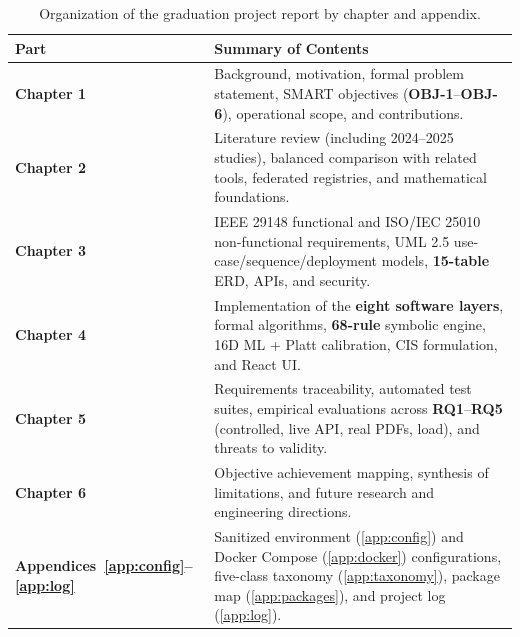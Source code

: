 \begin{table}[!htbp]
\centering
\caption[Organization of the graduation project report]{Organization of the graduation project report by chapter and appendix.}\label{tab:outline}
\begin{tabular}{|L{0.24}|L{0.76}|}
\hline
\textbf{Part} & \textbf{Summary of Contents} \\
\hline
\textbf{Chapter 1} & Background, motivation, formal problem statement, SMART objectives (\textbf{OBJ-1}--\textbf{OBJ-6}), operational scope, and contributions. \\
\hline
\textbf{Chapter 2} & Literature review (including 2024--2025 studies), balanced comparison with related tools, federated registries, and mathematical foundations. \\
\hline
\textbf{Chapter 3} & IEEE 29148 functional and ISO/IEC 25010 non-functional requirements, UML 2.5 use-case/sequence/deployment models, \textbf{15-table} ERD, APIs, and security. \\
\hline
\textbf{Chapter 4} & Implementation of the \textbf{eight software layers}, formal algorithms, \textbf{68-rule} symbolic engine, 16D ML + Platt calibration, CIS formulation, and React UI. \\
\hline
\textbf{Chapter 5} & Requirements traceability, automated test suites, empirical evaluations across \textbf{RQ1}--\textbf{RQ5} (controlled, live API, real PDFs, load), and threats to validity. \\
\hline
\textbf{Chapter 6} & Objective achievement mapping, synthesis of limitations, and future research and engineering directions. \\
\hline
\textbf{Appendices~\ref{app:config}--\ref{app:log}} & Sanitized environment (\ref{app:config}) and Docker Compose (\ref{app:docker}) configurations, five-class taxonomy (\ref{app:taxonomy}), package map (\ref{app:packages}), and project log (\ref{app:log}). \\
\hline
\end{tabular}
\end{table}
